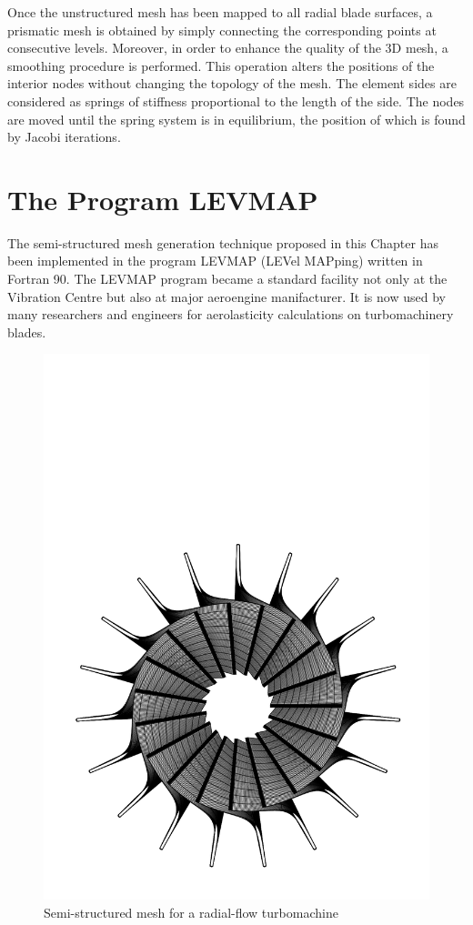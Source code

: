 %
 Once the unstructured mesh has been mapped to all radial blade surfaces,
 a prismatic mesh is obtained by simply connecting the
 corresponding points at consecutive levels. Moreover,
 in order to enhance the quality of the 3D mesh, a
 smoothing procedure is performed. This operation
 alters the positions of the interior nodes without changing
 the topology of the mesh.
 The element sides are considered as springs of stiffness proportional
 to the length of the side. The nodes are moved until the spring system
 is in equilibrium, the position of which is found by Jacobi
 iterations.
%
%
%
\section{The Program LEVMAP}
%
 The semi-structured mesh generation technique proposed in this Chapter
 has been implemented in the program LEVMAP (LEVel MAPping) written in
 Fortran 90. The LEVMAP program became a standard facility not only
 at the Vibration Centre but also at major aeroengine
 manifacturer. It is now used by
 many researchers and engineers for aerolasticity
 calculations on turbomachinery blades.
%
\begin{figure}[ht]
   \centerline{\includegraphics[width=140mm,clip=t]{CHAP_MESH/FIGURE/radial.pdf}}
   \caption{Semi-structured mesh for a radial-flow turbomachine}
   \label{radial_flow.fig}
\end{figure}
